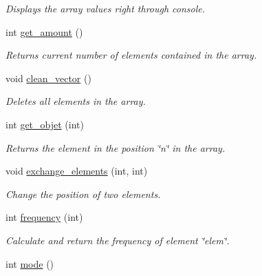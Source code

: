 \begin{DoxyCompactItemize}
\begin{DoxyCompactList}\small\item\em Displays the array values right through console. \end{DoxyCompactList}\item 
\hypertarget{classarray_a1e2e2da0c5c43d2a2c6f932036868d38}{int \hyperlink{classarray_a1e2e2da0c5c43d2a2c6f932036868d38}{get\-\_\-amount} ()}\label{classarray_a1e2e2da0c5c43d2a2c6f932036868d38}

\begin{DoxyCompactList}\small\item\em Returns current number of elements contained in the array. \end{DoxyCompactList}\item 
\hypertarget{classarray_a22cb040428decbd6b5b4d4be8c03cfd0}{void \hyperlink{classarray_a22cb040428decbd6b5b4d4be8c03cfd0}{clean\-\_\-vector} ()}\label{classarray_a22cb040428decbd6b5b4d4be8c03cfd0}

\begin{DoxyCompactList}\small\item\em Deletes all elements in the array. \end{DoxyCompactList}\item 
\hypertarget{classarray_a427fb838f6e374a9ea4ef0e7b44d93dd}{int \hyperlink{classarray_a427fb838f6e374a9ea4ef0e7b44d93dd}{get\-\_\-objet} (int)}\label{classarray_a427fb838f6e374a9ea4ef0e7b44d93dd}

\begin{DoxyCompactList}\small\item\em Returns the element in the position \char`\"{}n\char`\"{} in the array. \end{DoxyCompactList}\item 
\hypertarget{classarray_a22cde0113cdefb2a6d94e1f80e266995}{void \hyperlink{classarray_a22cde0113cdefb2a6d94e1f80e266995}{exchange\-\_\-elements} (int, int)}\label{classarray_a22cde0113cdefb2a6d94e1f80e266995}

\begin{DoxyCompactList}\small\item\em Change the position of two elements. \end{DoxyCompactList}\item 
\hypertarget{classarray_afe6a8d768c570a02b57263abcbe6a65e}{int \hyperlink{classarray_afe6a8d768c570a02b57263abcbe6a65e}{frequency} (int)}\label{classarray_afe6a8d768c570a02b57263abcbe6a65e}

\begin{DoxyCompactList}\small\item\em Calculate and return the frequency of element \char`\"{}elem\char`\"{}. \end{DoxyCompactList}\item 
\hypertarget{classarray_a706787bc95f2933241e6f5ba1635e78c}{int \hyperlink{classarray_a706787bc95f2933241e6f5ba1635e78c}{mode} ()}\label{classarray_a706787bc95f2933241e6f5ba1635e78c}


\end{DoxyCompactItemize}
